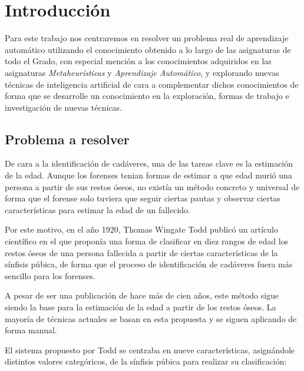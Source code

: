 \section{Introducción}

Para este trabajo nos centraremos en resolver un problema real de aprendizaje automático utilizando el conocimiento obtenido a lo largo de las asignaturas de todo el Grado, con especial mención a los conocimientos adquiridos en las asignaturas \textit{Metaheurísticas} y \textit{Aprendizaje Automático}, y explorando nuevas técnicas de inteligencia artificial de cara a complementar dichos conocimientos de forma que se desarrolle un conocimiento en la exploración, formas de trabajo e investigación de nuevas técnicas.

\subsection{Problema a resolver}

De cara a la identificación de cadáveres, una de las tareas clave es la estimación de la edad. Aunque los forenses tenian formas de estimar a que edad murió una persona a partir de sus restos óseos, no existía un método concreto y universal de forma que el forense solo tuviera que seguir ciertas pautas y observar ciertas características para estimar la edad de un fallecido.

Por este motivo, en el año 1920, Thomas Wingate Todd publicó un artículo científico \cite{todd} en el que proponía una forma de clasificar en diez rangos de edad los restos óseos de una persona fallecida a partir de ciertas características de la sínfisis púbica, de forma que el proceso de identificación de cadáveres fuera más sencillo para los forenses.

A pesar de ser una publicación de hace más de cien años, este método sigue siendo la base para la estimación de la edad a partir de los restos óseos. La mayoría de técnicas actuales se basan en esta propuesta y se siguen aplicando de forma manual.

El sistema propuesto por Todd se centraba en nueve características, asignándole distintos valores categóricos, de la sínfisis púbica para realizar su clasificación:

